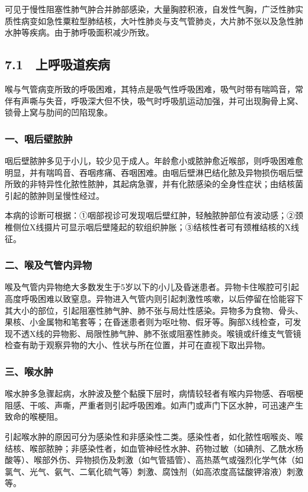 可见于慢性阻塞性肺气肿合并肺部感染，大量胸腔积液，自发性气胸，广泛性肺实质性病变如急性粟粒型肺结核，大叶性肺炎与支气管肺炎，大片肺不张以及急性肺水肿等疾病。由于肺呼吸面积减少所致。

\protect\hypertarget{text00045.html}{}{}

\subsection{7.1　上呼吸道疾病}

喉与气管病变所致的呼吸困难，其特点是吸气性呼吸困难，吸气时带有喘鸣音，常伴有声嘶与失音，呼吸深大但不快，吸气时呼吸肌运动加强，并可出现胸骨上窝、锁骨上窝与肋间的凹陷现象。

\subsubsection{一、咽后壁脓肿}

咽后壁脓肿多见于小儿，较少见于成人。年龄愈小或脓肿愈近喉部，则呼吸困难愈明显，并有喘鸣音、吞咽疼痛、吞咽困难。由咽后壁淋巴结化脓及异物损伤咽后壁所致的非特异性化脓性脓肿，其起病急骤，并有化脓感染的全身性症状；由结核菌引起的脓肿则呈慢性经过。

本病的诊断可根据：①咽部视诊可发现咽后壁红肿，轻触脓肿部位有波动感；②颈椎侧位X线摄片可显示咽后壁隆起的软组织肿胀；③结核性者可有颈椎结核的X线征。

\subsubsection{二、喉及气管内异物}

喉及气管内异物绝大多数发生于5岁以下的小儿及昏迷患者。异物卡住喉腔可引起高度呼吸困难以致窒息。异物进入气管内则引起刺激性咳嗽，以后停留在恰能容下其大小的部位，引起阻塞性肺气肿、肺不张与局灶性感染。异物多为食物、骨头、果核、小金属物和笔套等；在昏迷患者则为呕吐物、假牙等。胸部X线检查，可发现不透X线的异物影、局限性肺气肿、肺不张或阻塞性肺炎。喉镜或纤维支气管镜检查有助于观察异物的大小、性状与所在位置，并可在直视下取出异物。

\subsubsection{三、喉水肿}

喉水肿多急骤起病，水肿波及整个黏膜下层时，病情较轻者有喉内异物感、吞咽梗阻感、干咳、声嘶，严重者则引起呼吸困难。如声门或声门下区水肿，可迅速产生致命的喉梗阻。

引起喉水肿的原因可分为感染性和非感染性二类。感染性者，如化脓性咽喉炎、喉结核、喉部脓肿；非感染性者，如血管神经性水肿、药物过敏（如碘剂、乙酰水杨酸等）、喉部外伤、异物损伤及刺激（如气管插管）、高热蒸气或强烈化学气体（如氯气、光气、氨气、二氧化硫气等）刺激、腐蚀剂（如高浓度高锰酸钾溶液）刺激等。

